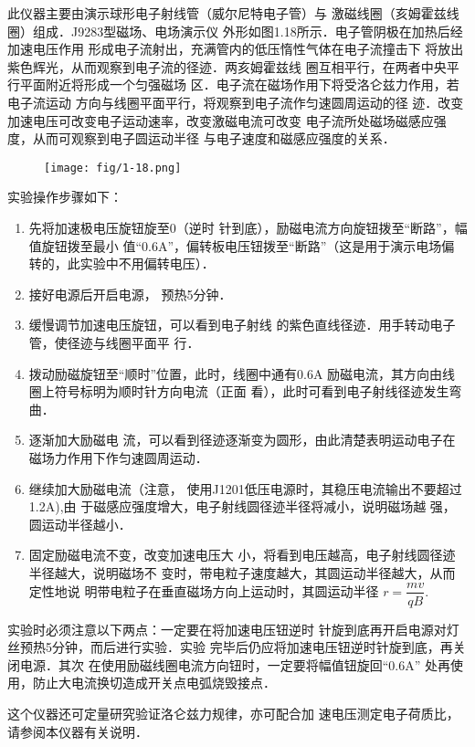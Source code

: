 此仪器主要由演示球形电子射线管（威尔尼特电子管）与
激磁线圈（亥姆霍兹线圈）组成．J9283型磁场、电场演示仪
外形如图1.18所示．电子管阴极在加热后经加速电压作用
形成电子流射出，充满管内的低压惰性气体在电子流撞击下
将放出紫色辉光，从而观察到电子流的径迹．两亥姆霍兹线
圈互相平行，在两者中央平行平面附近将形成一个匀强磁场
区．电子流在磁场作用下将受洛仑兹力作用，若电子流运动
方向与线圈平面平行，将观察到电子流作匀速圆周运动的径
迹．改变加速电压可改变电子运动速率，改变激磁电流可改变
电子流所处磁场磁感应强度，从而可观察到电子圆运动半径
与电子速度和磁感应强度的关系．
\begin{figure}[htp]
    \centering
\texttt{[image: fig/1-18.png]}
    \caption{}
\end{figure}

实验操作步骤如下：
\begin{enumerate}
\item 先将加速极电压旋钮旋至0（逆时
针到底），励磁电流方向旋钮拨至“断路”，幅值旋钮拨至最小
值“0.6A”，偏转板电压钮拨至“断路”（这是用于演示电场偏
转的，此实验中不用偏转电压）．
    \item 接好电源后开启电源，
预热5分钟．
    \item 缓慢调节加速电压旋钮，可以看到电子射线
的紫色直线径迹．用手转动电子管，使径迹与线圈平面平
行．
    \item 拨动励磁旋钮至“顺时”位置，此时，线圈中通有0.6A
励磁电流，其方向由线圈上符号标明为顺时针方向电流（正面
看），此时可看到电子射线径迹发生弯曲．
\item 逐渐加大励磁电
流，可以看到径迹逐渐变为圆形，由此清楚表明运动电子在
磁场力作用下作匀速圆周运动．
\item 继续加大励磁电流（注意，
使用J1201低压电源时，其稳压电流输出不要超过1.2A),由
于磁感应强度增大，电子射线圆径迹半径将减小，说明磁场越
强，圆运动半径越小．
\item 固定励磁电流不变，改变加速电压大
小，将看到电压越高，电子射线圆径迹半径越大，说明磁场不
变时，带电粒子速度越大，其圆运动半径越大，从而定性地说
明带电粒子在垂直磁场方向上运动时，其圆运动半径
$r=\dfrac{mv}{qB}$.
\end{enumerate}

实验时必须注意以下两点：一定要在将加速电压钮逆时
针旋到底再开启电源对灯丝预热5分钟，而后进行实验．实验
完毕后仍应将加速电压钮逆时针旋到底，再关闭电源．其次
在使用励磁线圈电流方向钮时，一定要将幅值钮旋回“0.6A”
处再使用，防止大电流换切造成开关点电弧烧毁接点．

这个仪器还可定量研究验证洛仑兹力规律，亦可配合加
速电压测定电子荷质比，请参阅本仪器有关说明．

